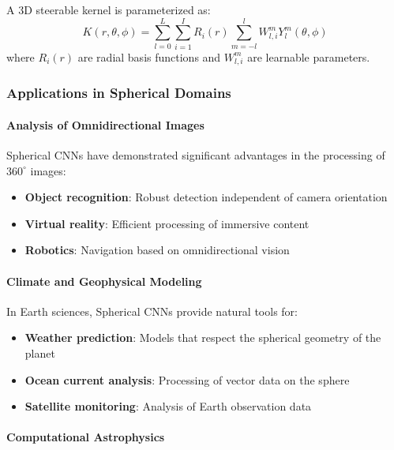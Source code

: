 \begin{definition}
A 3D steerable kernel is parameterized as:
\begin{equation}
K(r, \theta, \phi) = \sum_{l=0}^{L} \sum_{i=1}^{I} R_i(r) \sum_{m=-l}^{l} W_{l,i}^m Y_l^m(\theta, \phi)
\end{equation}
where $R_i(r)$ are radial basis functions and $W_{l,i}^m$ are learnable parameters.
\end{definition}

\subsubsection{Applications in Spherical Domains}

\paragraph{Analysis of Omnidirectional Images}

Spherical CNNs have demonstrated significant advantages in the processing of $360^\circ$ images:

\begin{itemize}
    \item \textbf{Object recognition}: Robust detection independent of camera orientation
    \item \textbf{Virtual reality}: Efficient processing of immersive content
    \item \textbf{Robotics}: Navigation based on omnidirectional vision
\end{itemize}

\paragraph{Climate and Geophysical Modeling}

In Earth sciences, Spherical CNNs provide natural tools for:

\begin{itemize}
    \item \textbf{Weather prediction}: Models that respect the spherical geometry of the planet
    \item \textbf{Ocean current analysis}: Processing of vector data on the sphere
    \item \textbf{Satellite monitoring}: Analysis of Earth observation data
\end{itemize}

\paragraph{Computational Astrophysics}

